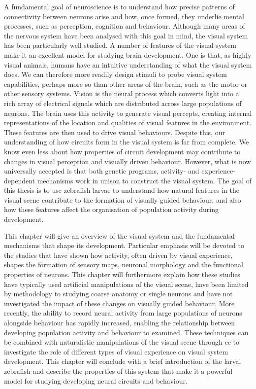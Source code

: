 A fundamental goal of neuroscience is to understand how precise patterns of connectivity between neurons arise and how, once formed, they underlie mental processes, such as perception, cognition and behaviour. Although many areas of the nervous system have been analysed with this goal in mind, the visual system has been particularly well studied. A number of features of the visual system make it an excellent model for studying brain development. One is that, as highly visual animals, humans have an intuitive understanding of what the visual system does. We can therefore more readily design stimuli to probe visual system capabilities, perhaps more so than other areas of the brain, such as the motor or other sensory systems. Vision is the neural process which converts light into a rich array of electrical signals which are distributed across large populations of neurons. The brain uses this activity to generate visual percepts, creating internal representations of the location and qualities of visual features in the environment. These features are then used to drive visual behaviours. Despite this, our understanding of how circuits form in the visual system is far from complete. We know even less about how properties of circuit development may contribute to changes in visual perception and visually driven behaviour. However, what is now universally accepted is that both genetic programs, activity- and experience-dependent mechanisms work in unison to construct the visual system. The goal of this thesis is to use zebrafish larvae to understand how natural features in the visual scene contribute to the formation of visually guided behaviour, and also how these features affect the organisation of population activity during development.

This chapter will give an overview of the visual system and the fundamental mechanisms that shape its development. Particular emphasis will be devoted to the studies that have shown how activity, often driven by visual experience, shapes the formation of sensory maps, neuronal morphology and the functional properties of neurons. This chapter will furthermore explain how these studies have typically used artificial manipulations of the visual scene, have been limited by methodology to studying coarse anatomy or single neurons and have not investigated the impact of these changes on visually guided behaviour. More recently, the ability to record  neural activity from large populations of neurons alongside behaviour has rapidly increased, enabling the relationship between developing population activity and behaviour to examined.  These techniques can be combined with naturalistic manipulations of the visual scene through \gls{ee} to investigate the role of different types of visual experience on visual system development. This chapter will conclude with a brief introduction of the larval zebrafish and describe the properties of this system that make it a powerful model for studying developing neural circuits and behaviour. 

